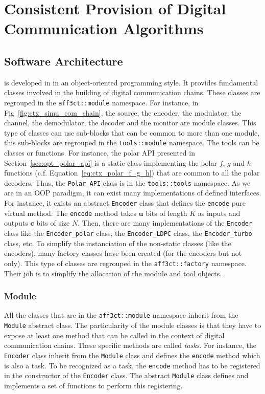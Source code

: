 \section{Consistent Provision of Digital Communication Algorithms}

\subsection{Software Architecture}
\label{sec:aff3ct_archi}

\AFFECT is developed in \Cxx in an object-oriented programming style. It
provides fundamental classes involved in the building of digital communication
chains. These classes are regrouped in the \verb|aff3ct::module| namespace. For
instance, in Fig~\ref{fig:ctx_simu_com_chain}, the source, the encoder, the
modulator, the channel, the demodulator, the decoder and the monitor are module
classes. This type of classes can use sub-blocks that can be common to more than
one module, this sub-blocks are regrouped in the \verb|tools::module| namespace.
The tools can be classes or functions. For instance, the polar API presented in
Section~\ref{sec:opt_polar_api} is a static class implementing the polar $f$,
$g$ and $h$ functions (c.f. Equation~\ref{eq:ctx_polar_f_g_h}) that are common
to all the polar decoders. Thus, the \verb|Polar_API| class is in the
\verb|tools::tools| namespace. As we are in an OOP paradigm, it can exist many
implementations of defined interfaces. For instance, it exists an abstract
\verb|Encoder| class that defines the \verb|encode| pure virtual method. The
\verb|encode| method takes $\bm{u}$ bits of length $K$ as inputs and outputs
$\bm{c}$ bits of size $N$. Then, there are many implementations of the
\verb|Encoder| class like the \verb|Encoder_polar| class, the
\verb|Encoder_LDPC| class, the \verb|Encoder_turbo| class, etc. To simplify the
instanciation of the non-static classes (like the encoders), many factory
classes have been created (for the encoders but not only). This type of classes
are regrouped in the \verb|aff3ct::factory| namespace. Their job is to simplify
the allocation of the module and tool objects.

\subsubsection{Module}

All the classes that are in the \verb|aff3ct::module| namespace inherit from the
\verb|Module| abstract class. The particularity of the module classes is that
they have to expose at least one method that can be called in the context of
digital communication chains. These specific methods are called \emph{tasks}.
For instance, the \verb|Encoder| class inherit from the \verb|Module| class and
defines the \verb|encode| method which is also a task. To be recognized as a
task, the \verb|encode| method has to be registered in the constructor of the
\verb|Encoder| class. The abstract \verb|Module| class defines and implements a
set of functions to perform this registering.

